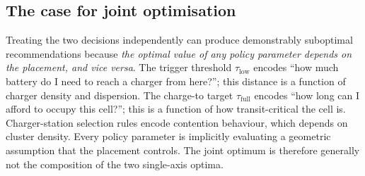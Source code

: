 \documentclass[conference]{IEEEtran}
\begin{document}
\subsection{The case for joint optimisation}
Treating the two decisions independently can produce demonstrably suboptimal recommendations because \emph{the optimal value of any policy parameter depends on the placement, and vice versa}. The trigger threshold $\tau_\text{low}$ encodes ``how much battery do I need to reach a charger from here?''; this distance is a function of charger density and dispersion. The charge-to target $\tau_\text{full}$ encodes ``how long can I afford to occupy this cell?''; this is a function of how transit-critical the cell is. Charger-station selection rules encode contention behaviour, which depends on cluster density. Every policy parameter is implicitly evaluating a geometric assumption that the placement controls. The joint optimum is therefore generally not the composition of the two single-axis optima.
\end{document}
